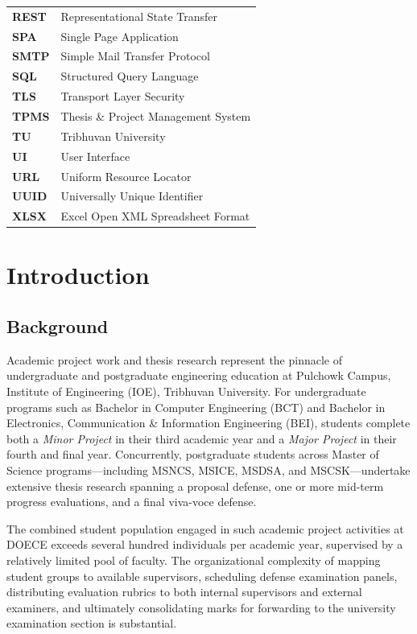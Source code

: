 \documentclass[12pt]{report}
\begin{document}
\begin{tabular}{p{2.5cm} l}
\textbf{REST}     & Representational State Transfer\\
\textbf{SPA}      & Single Page Application\\
\textbf{SMTP}     & Simple Mail Transfer Protocol\\
\textbf{SQL}      & Structured Query Language\\
\textbf{TLS}      & Transport Layer Security\\
\textbf{TPMS}     & Thesis \& Project Management System\\
\textbf{TU}       & Tribhuvan University\\
\textbf{UI}       & User Interface\\
\textbf{URL}      & Uniform Resource Locator\\
\textbf{UUID}     & Universally Unique Identifier\\
\textbf{XLSX}     & Excel Open XML Spreadsheet Format\\
\end{tabular}

\chapter{Introduction}

\section{Background}

Academic project work and thesis research represent the pinnacle of undergraduate and postgraduate engineering education at Pulchowk Campus, Institute of Engineering (IOE), Tribhuvan University. For undergraduate programs such as Bachelor in Computer Engineering (BCT) and Bachelor in Electronics, Communication \& Information Engineering (BEI), students complete both a \textit{Minor Project} in their third academic year and a \textit{Major Project} in their fourth and final year. Concurrently, postgraduate students across Master of Science programs---including MSNCS, MSICE, MSDSA, and MSCSK---undertake extensive thesis research spanning a proposal defense, one or more mid-term progress evaluations, and a final viva-voce defense.

The combined student population engaged in such academic project activities at DOECE exceeds several hundred individuals per academic year, supervised by a relatively limited pool of faculty. The organizational complexity of mapping student groups to available supervisors, scheduling defense examination panels, distributing evaluation rubrics to both internal supervisors and external examiners, and ultimately consolidating marks for forwarding to the university examination section is substantial.
\end{document}
